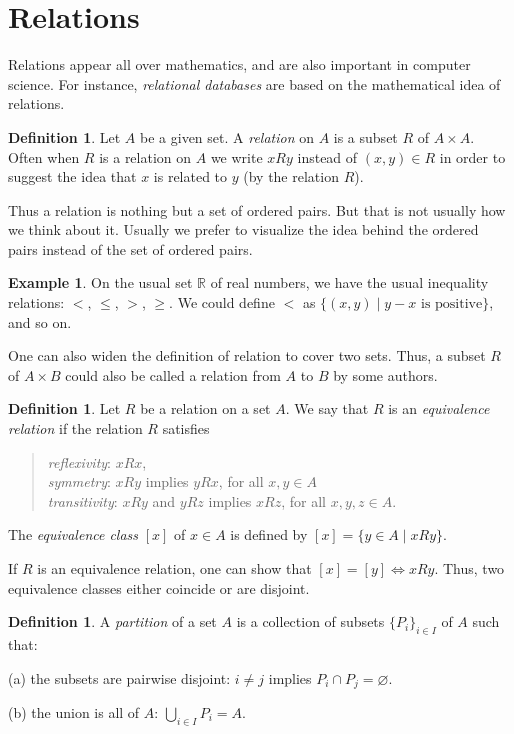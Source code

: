 \documentclass[11pt]{article}
\theoremstyle{definition}
\newtheorem{defn}[thm]{Definition}
\newtheorem{example}[thm]{Example}
\newcommand{\R}{\mathbb{R}} %
\renewcommand{\iff}{\Leftrightarrow}
\begin{document}
\newpage\section{Relations}\noindent
Relations appear all over mathematics, and are also important in
computer science. For instance, \emph{relational databases} are based
on the mathematical idea of relations.


\begin{defn}
  Let $A$ be a given set.  A {\em relation} on $A$ is
  a subset $R$ of $A \times A$.  Often when $R$ is a relation on $A$
  we write $xRy$ instead of $(x,y) \in R$ in order to suggest the idea
  that $x$ is related to $y$ (by the relation $R$).
\end{defn}

Thus a relation is nothing but a set of ordered pairs. But that is not
usually how we think about it. Usually we prefer to visualize the idea
behind the ordered pairs instead of the set of ordered pairs.

\begin{example}
  On the usual set $\R$ of real numbers, we have the usual inequality
  relations: $<$, $\le$, $>$, $\ge$. We could define $<$ as $\{ (x,y)
  \mid y-x \text{ is positive}\}$, and so on.
\end{example}

One can also widen the definition of relation to cover two sets. Thus,
a subset $R$ of $A \times B$ could also be called a relation from $A$
to $B$ by some authors.



\begin{defn}
Let $R$ be a relation on a set $A$. We say that $R$ is an {\em
  equivalence relation} if the relation $R$ satisfies
\begin{quote}
 {\em reflexivity}: $xRx$, \\ {\em symmetry}: $xRy$ implies $yRx$, for
 all $x,y \in A$\\ {\em transitivity}: $xRy$ and $yRz$ implies $xRz$,
 for all $x,y,z \in A$. 
\end{quote}
The \emph{equivalence class} $[x]$ of $x \in A$ is defined by
$[x] = \{ y \in A \mid xRy\}$.
\end{defn}

If $R$ is an equivalence relation, one can show that $[x] =
[y] \iff xRy$. Thus, two equivalence classes either coincide
or are disjoint.

\begin{defn}
A \emph{partition} of a set $A$ is a collection of subsets $\{P_i\}_{i
  \in I}$ of $A$ such that: 
  \par (a) the subsets are pairwise
  disjoint: $i \ne j$ implies $P_i \cap P_j = \varnothing$.
  \par (b) the union is all of $A$: $\bigcup_{i \in I} P_i = A$.
\end{defn}
\end{document}
